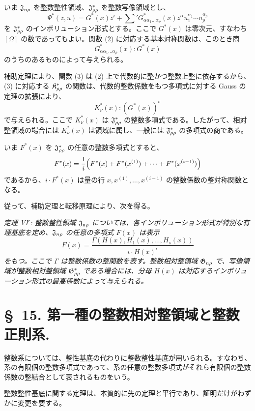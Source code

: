 \documentclass[11pt]{article}
\begin{document}
いま $\mathfrak{J}_{n\rho}$ を整数整性領域、$\mathfrak{J}^*_{\rho\rho}$ を整数写像領域とし、
\[
  \Psi^*(z,u)=G^*(x)z^i+
  \sum{}'G^*_{\alpha\alpha_1\ldots\alpha_\rho}(x)
  z^\alpha u_1^{\alpha_1}\cdots u_\rho^{\alpha_\rho}
\]
を $\mathfrak{J}^*_{\rho\rho}$ のインボリューション形式とする。ここで $G^*(x)$ は零次元、すなわち $[\Omega]$ の数であってもよい。関数 (2) に対応する基本対称関数は、このとき商
\begin{equation}
  G^*_{\alpha\alpha_1\ldots\alpha_\rho}(x):G^*(x)
\tag{4}
\end{equation}
のうちのあるものによって与えられる。

補助定理により、関数 (3) は (2) 上で代数的に整かつ整数上整に依存するから、(3) に対応する $\mathfrak{K}^*_{\rho\rho}$ の関数は、代数的整数係数をもつ多項式に対する Gauss の定理の拡張により、
\begin{equation}
  K_\nu^*(x):(G^*(x))^\sigma
\tag{5}
\end{equation}
で与えられる。ここで $K_\nu^*(x)$ は $\mathfrak{J}^*_{\rho\rho}$ の整数多項式である。したがって、相対整領域の場合には $K_\nu^*(x)$ は領域に属し、一般には $\mathfrak{J}^*_{\rho\rho}$ の多項式の商である。

いま $F^*(x)$ を $\mathfrak{J}^*_{\rho\rho}$ の任意の整数多項式とすると、
\[
  F^*(x)=\frac1i\Bigl(F^*(x)+F^*(x^{(1)})+\cdots+F^*(x^{(i-1)})\Bigr)
\]
であるから、$i\cdot F^*(x)$ は量の行 $x,x^{(1)},\ldots,x^{(i-1)}$ の整数係数の整対称関数となる。

従って、補助定理と転移原理により、次を得る。

\emph{定理 VI$'$: 整数整性領域 $\mathfrak{J}_{n\rho}$ については、各インボリューション形式が特別な有理基底を定め、$\mathfrak{J}_{n\rho}$ の任意の多項式 $F(x)$ は表示}
\[
  F(x)=\frac{\Gamma(H(x),H_1(x),\ldots,H_s(x))}{i\cdot H(x)^i}
\]
\emph{をもつ。ここで $\Gamma$ は整数係数の整関数を表す。整数相対整領域 $\mathfrak{G}_{n\rho}$ で、写像領域が整数相対整領域 $\mathfrak{G}^*_{\rho\rho}$ である場合には、分母 $H(x)$ は対応するインボリューション形式の最高係数によって与えられる。}

\section*{\S\ 15. 第一種の整数相対整領域と整数正則系.}

整数系については、整性基底の代わりに整数整性基底が用いられる。すなわち、系の有限個の整数多項式であって、系の任意の整数多項式がそれら有限個の整数係数の整結合として表されるものをいう。

整数整性基底に関する定理は、本質的に先の定理と平行であり、証明だけがわずかに変更を要する。
\end{document}
